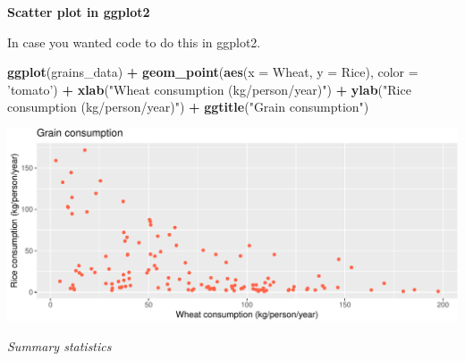 \documentclass[ignorenonframetext,]{beamer}
\newenvironment{Shaded}{\begin{snugshade}}{\end{snugshade}}
\newcommand{\DataTypeTok}[1]{\textcolor[rgb]{0.13,0.29,0.53}{#1}}
\newcommand{\KeywordTok}[1]{\textcolor[rgb]{0.13,0.29,0.53}{\textbf{#1}}}
\newcommand{\NormalTok}[1]{#1}
\newcommand{\OperatorTok}[1]{\textcolor[rgb]{0.81,0.36,0.00}{\textbf{#1}}}
\newcommand{\StringTok}[1]{\textcolor[rgb]{0.31,0.60,0.02}{#1}}
\begin{document}
\begin{frame}[fragile]{}
\protect\hypertarget{section-24}{}

\textbf{\large Scatter plot in ggplot2}

In case you wanted code to do this in ggplot2.

\vspace{1ex}\scriptsize

\begin{Shaded}
\begin{Highlighting}[]
\KeywordTok{ggplot}\NormalTok{(grains_data) }\OperatorTok{+}
\StringTok{  }\KeywordTok{geom_point}\NormalTok{(}\KeywordTok{aes}\NormalTok{(}\DataTypeTok{x =}\NormalTok{ Wheat, }\DataTypeTok{y =}\NormalTok{ Rice), }\DataTypeTok{color =} \StringTok{'tomato'}\NormalTok{) }\OperatorTok{+}
\StringTok{  }\KeywordTok{xlab}\NormalTok{(}\StringTok{"Wheat consumption (kg/person/year)"}\NormalTok{) }\OperatorTok{+}\StringTok{ }
\StringTok{  }\KeywordTok{ylab}\NormalTok{(}\StringTok{"Rice consumption (kg/person/year)"}\NormalTok{) }\OperatorTok{+}
\StringTok{  }\KeywordTok{ggtitle}\NormalTok{(}\StringTok{"Grain consumption"}\NormalTok{)}
\end{Highlighting}
\end{Shaded}

\includegraphics{lecture-03_files/figure-beamer/unnamed-chunk-16-1.pdf}

\end{frame}

\begin{frame}[standout]{}
\protect\hypertarget{section-25}{}

\begin{center}
        
    \vspace{2.3em}
    \color{white}\textit{\Huge\gar Summary statistics}
\end{center}

\end{frame}
\end{document}

